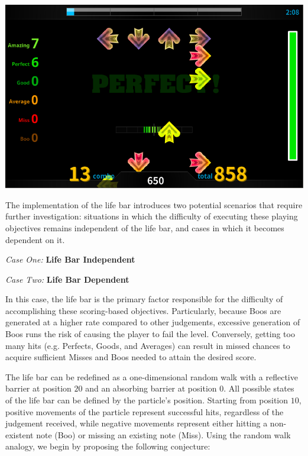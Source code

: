 \begin{center}
\includegraphics[width=15cm]{reports/figures/images/gameplay.png}
\label{fig:gameplay}
\end{center}

The implementation of the life bar introduces two potential scenarios that require further investigation: situations in which the difficulty of executing these playing objectives remains independent of the life bar, and cases in which it becomes dependent on it.

\vspace{2mm}

\textit{Case One:} \textbf{Life Bar Independent}

\vspace{2mm}

\textit{Case Two:} \textbf{Life Bar Dependent}

\vspace{2mm}
In this case, the life bar is the primary factor responsible for the difficulty of accomplishing these scoring-based objectives. Particularly, because Boos are generated at a higher rate compared to other judgements, excessive generation of Boos runs the risk of causing the player to fail the level. Conversely, getting too many hits (e.g. Perfects, Goods, and Averages) can result in missed chances to acquire sufficient Misses and Boos needed to attain the desired score.

\vspace{2mm}

The life bar can be redefined as a one-dimensional random walk with a reflective barrier at position $20$ and an absorbing barrier at position $0$. All possible states of the life bar can be defined by the particle's position. Starting from position $10$, positive movements of the particle represent successful hits, regardless of the judgement received, while negative movements represent either hitting a non-existent note (Boo) or missing an existing note (Miss). Using the random walk analogy, we begin by proposing the following conjecture:

